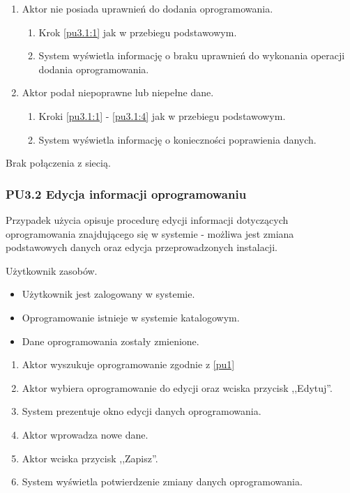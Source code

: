 \begin{enumerate}
\item Aktor nie posiada uprawnień do dodania oprogramowania.
	\begin{enumerate}[label*=\arabic*.]
		\item Krok \ref{pu3.1:1} jak w przebiegu podstawowym.
		\item System wyświetla informację o braku uprawnień do wykonania operacji dodania oprogramowania.
	\end{enumerate}
\item Aktor podał niepoprawne lub niepełne dane.
	\begin{enumerate}[label*=\arabic*.]
		\item Kroki \ref{pu3.1:1} - \ref{pu3.1:4} jak w przebiegu podstawowym.
		\item System wyświetla informację o konieczności poprawienia danych.
	\end{enumerate}
\end{enumerate}

Brak połączenia z siecią.

\subsubsection{PU3.2 Edycja informacji oprogramowaniu}

Przypadek użycia opisuje procedurę edycji informacji dotyczących oprogramowania znajdującego się w systemie - możliwa jest zmiana podstawowych danych oraz edycja przeprowadzonych instalacji.

Użytkownik zasobów.

\begin{itemize}
\item Użytkownik jest zalogowany w systemie.
\item Oprogramowanie istnieje w systemie katalogowym.
\end{itemize}

\begin{itemize}
\item Dane oprogramowania zostały zmienione.
\end{itemize}

\begin{enumerate}
\item \label{pu3.2:1} Aktor wyszukuje oprogramowanie zgodnie z \ref{pu1}
\item \label{pu3.2:2} Aktor wybiera oprogramowanie do edycji oraz wciska przycisk ,,Edytuj''.
\item System prezentuje okno edycji danych oprogramowania.
\item Aktor wprowadza nowe dane.
\item \label{pu3.2:5} Aktor wciska przycisk ,,Zapisz''.
\item System wyświetla potwierdzenie zmiany danych oprogramowania.
\end{enumerate}

